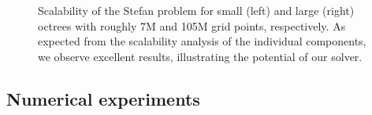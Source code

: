 \begin{figure}
\centering
{}
\caption{Scalability of the Stefan problem for small (left) and large (right) octrees with roughly 7M and 105M grid points, respectively. As expected from the scalability analysis of the individual components, we observe excellent results, illustrating the potential of our solver.}
\label{fig:stefan_scaling}
\end{figure}

\subsection{Numerical experiments}

